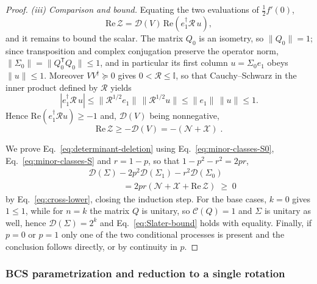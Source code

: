 \documentclass[prx,twocolumn,superscriptaddress,aps,10pt, frontmatterverbose, reprint,footinbib,longbibliography=true]{revtex4-2}
\newcommand{\trans}{\mathsf{T}}
\begin{document}
\begin{proof}
\emph{(iii) Comparison and bound.} Equating the two evaluations of $\tfrac12f'(0)$,
\begin{equation}
    \mathrm{Re}\,\mathcal{Z}=\mathcal{D}(V)\,\mathrm{Re}\!\left(e_1^\dagger\mathcal{R}\,u\right),
\end{equation}
and it remains to bound the scalar. The matrix $Q_0$ is an isometry, so $\lVert Q_0\rVert=1$; since transposition and complex conjugation preserve the operator norm, $\lVert\Sigma_0\rVert=\lVert Q_0^{\trans}Q_0\rVert\le1$, and in particular its first column $u=\Sigma_0e_1$ obeys $\lVert u\rVert\le1$. Moreover $VV^\dagger\succeq0$ gives $0<\mathcal{R}\le\mathbb{I}$, so that Cauchy--Schwarz in the inner product defined by $\mathcal{R}$ yields
\begin{equation}
    \left|e_1^\dagger\mathcal{R}\,u\right|\le\lVert\mathcal{R}^{1/2}e_1\rVert\,\lVert\mathcal{R}^{1/2}u\rVert\le\lVert e_1\rVert\,\lVert u\rVert\le1 .
\end{equation}
Hence $\mathrm{Re}(e_1^\dagger\mathcal{R}u)\ge-1$ and, $\mathcal{D}(V)$ being nonnegative,
\begin{equation}
    \mathrm{Re}\,\mathcal{Z}\ge-\mathcal{D}(V)=-(\mathcal{N}+\mathcal{X})\;.
    \label{eq:cross-lower}
\end{equation}

We prove Eq.~\eqref{eq:determinant-deletion} using Eq.~\eqref{eq:minor-classes-S0}, Eq.~\eqref{eq:minor-classes-S} and $r=1-p$, so that $1-p^2-r^2=2pr$,
\begin{equation}
\begin{split}
    &\mathcal{D}(\Sigma)-2p^2\mathcal{D}(\Sigma_1)-r^2\mathcal{D}(\Sigma_0)\\
    &\qquad\qquad =2pr\left(\mathcal{N}+\mathcal{X}+\mathrm{Re}\,\mathcal{Z}\right)\;\ge\;0
    \end{split}
\end{equation} 
by Eq.~\eqref{eq:cross-lower}, closing the induction step. For the base cases, $k=0$ gives $1\le1$, while for $n=k$ the matrix $Q$ is unitary, so $\mathcal{C}(Q)=1$ and $\Sigma$ is unitary as well, hence $\mathcal{D}(\Sigma)=2^k$ and Eq.~\eqref{eq:Slater-bound} holds with equality. Finally, if $p=0$ or $p=1$ only one of the two conditional processes is present and the conclusion follows directly, or by continuity in $p$.
\end{proof}

\subsubsection{ BCS parametrization and reduction to a single rotation}
\label{app:proof:thouless}
\end{document}
